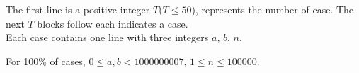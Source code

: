 The first line is a positive integer $T$($T \leq 50$), represents the number of case. The next $T$ blocks follow each indicates a case.\\
Each case contains one line with three integers $a$, $b$, $n$.

For 100\% of cases, $0 \leq a,b < 1000000007$, $1 \leq n \leq 100000$.